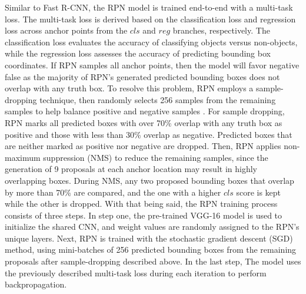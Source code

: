 Similar to Fast R-CNN, the RPN model is trained end-to-end with a multi-task loss. The multi-task loss is derived based on the classification loss and regression loss across anchor points from the $cls$ and $reg$ branches, respectively. The classification loss evaluates the accuracy of classifying objects versus non-objects, while the regression loss assesses the accuracy of predicting bounding box coordinates. If RPN samples all anchor points, then the model will favor negative false as the majority of RPN's generated predicted bounding boxes does not overlap with any truth box. To resolve this problem, RPN employs a sample-dropping technique, then randomly selects 256 samples from the remaining samples to help balance positive and negative samples \cite{faster_rcnn_2015}. For sample dropping, RPN marks all predicted boxes with over 70\% overlap with any truth box as positive and those with less than 30\% overlap as negative. Predicted boxes that are neither marked as positive nor negative are dropped. Then, RPN applies non-maximum suppression (NMS) to reduce the remaining samples, since the generation of 9 proposals at each anchor location may result in highly overlapping boxes. During NMS, any two proposed bounding boxes that overlap by more than 70\% are compared, and the one with a higher $cls$ score is kept while the other is dropped. With that being said, the RPN training process consists of three steps. In step one, the pre-trained VGG-16 model is used to initialize the shared CNN, and weight values are randomly assigned to the RPN's unique layers. Next, RPN is trained with the stochastic gradient descent (SGD) method, using mini-batches of 256 predicted bounding boxes from the remaining proposals after sample-dropping described above. In the last step, The model uses the previously described multi-task loss during each iteration to perform backpropagation.

